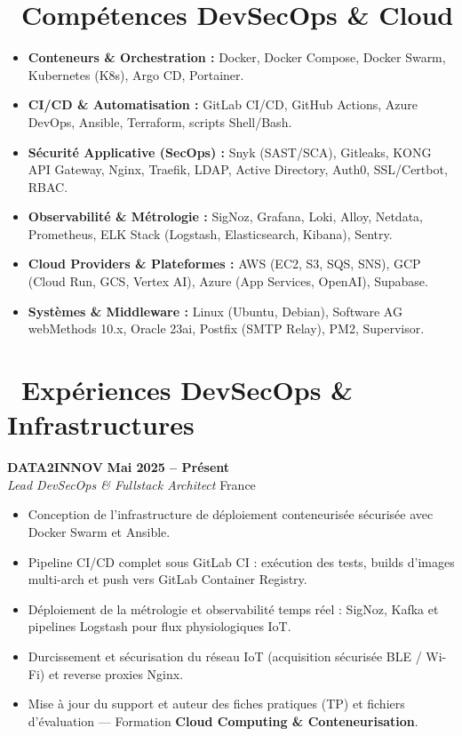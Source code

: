 \documentclass[10pt,a4paper]{article}
\begin{document}
\section{\faCogs\ Compétences DevSecOps \& Cloud}
\begin{itemize}[leftmargin=1.4em, itemsep=0.25em, topsep=0.15em]
    \item \textbf{Conteneurs \& Orchestration :} Docker, Docker Compose, Docker Swarm, Kubernetes (K8s), Argo CD, Portainer.
    \item \textbf{CI/CD \& Automatisation :} GitLab CI/CD, GitHub Actions, Azure DevOps, Ansible, Terraform, scripts Shell/Bash.
    \item \textbf{Sécurité Applicative (SecOps) :} Snyk (SAST/SCA), Gitleaks, KONG API Gateway, Nginx, Traefik, LDAP, Active Directory, Auth0, SSL/Certbot, RBAC.
    \item \textbf{Observabilité \& Métrologie :} SigNoz, Grafana, Loki, Alloy, Netdata, Prometheus, ELK Stack (Logstash, Elasticsearch, Kibana), Sentry.
    \item \textbf{Cloud Providers \& Plateformes :} AWS (EC2, S3, SQS, SNS), GCP (Cloud Run, GCS, Vertex AI), Azure (App Services, OpenAI), Supabase.
    \item \textbf{Systèmes \& Middleware :} Linux (Ubuntu, Debian), Software AG webMethods 10.x, Oracle 23ai, Postfix (SMTP Relay), PM2, Supervisor.
\end{itemize}

\section{\faBriefcase\ Expériences DevSecOps \& Infrastructures}

\textbf{\large DATA2INNOV} \hfill {\bfseries\small\color{slateGray} Mai 2025 -- Présent} \\
\emph{\color{primary}Lead DevSecOps \& Fullstack Architect} \hfill {\small France}
\begin{itemize}[leftmargin=1.4em, itemsep=0.18em, topsep=0.15em]
    \item Conception de l'infrastructure de déploiement conteneurisée sécurisée avec Docker Swarm et Ansible.
    \item Pipeline CI/CD complet sous GitLab CI : exécution des tests, builds d'images multi-arch et push vers GitLab Container Registry.
    \item Déploiement de la métrologie et observabilité temps réel : SigNoz, Kafka et pipelines Logstash pour flux physiologiques IoT.
    \item Durcissement et sécurisation du réseau IoT (acquisition sécurisée BLE / Wi-Fi) et reverse proxies Nginx.
    \item Mise à jour du support et auteur des fiches pratiques (TP) et fichiers d'évaluation --- Formation \textbf{Cloud Computing \& Conteneurisation}.
\end{itemize}
\end{document}
